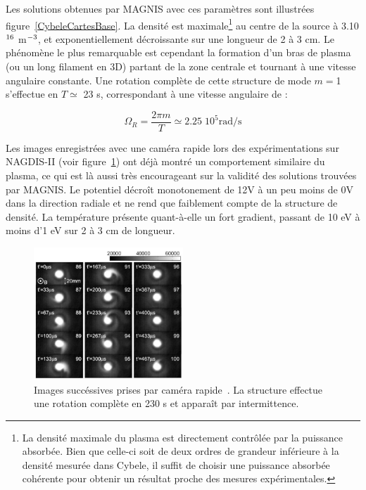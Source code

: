 \begin{refsection}
Les solutions obtenues par MAGNIS avec ces paramètres sont illustrées
figure~\ref{CybeleCartesBase}. La densité est maximale\footnote{La
densité maximale du plasma est directement contrôlée par la puissance
absorbée. Bien que celle-ci soit de deux ordres de grandeur inférieure à la
densité mesurée dans Cybele, il suffit de choisir une puissance absorbée
cohérente pour obtenir un résultat proche des mesures expérimentales.} au centre
de la source à 3.10$^{{16}}$ m$^{{-3}}$, et
exponentiellement décroissante sur une longueur de 2 à 3 cm. Le phénomène le plus
remarquable est cependant la formation d'un bras de plasma (ou un long filament
en 3D) partant de la zone centrale et tournant à une vitesse angulaire
constante.
Une rotation complète de cette structure de mode $m=$1 s'effectue en $T\simeq$
23 \micro s, correspondant à une vitesse angulaire de :

\begin{equation}
\Omega_R=\frac{2\pi m}{T}\simeq2.25\;10^5\text{rad/s}
\end{equation}

Les images enregistrées avec une caméra rapide lors des expérimentations
sur NAGDIS-II (voir figure~\ref{4-CybeleNagdis}) ont déjà montré un comportement
similaire du plasma, ce qui est là aussi très
encourageant sur la validité des solutions trouvées par MAGNIS. Le potentiel
décroît monotonement de 12V à un peu moins de 0V dans la direction radiale et
ne rend que faiblement compte de la structure de densité.
 La température présente quant-à-elle un fort gradient, passant de 10 eV à moins
 d'1 eV sur 2 à 3 cm de longueur.

\begin{figure}[!htbp]
\centering
\includegraphics[width=0.5\textwidth]{figures/4-CybeleNAGDIS.png}
\caption{Images succéssives prises par caméra rapide~\parencite{NagdisCamera}.
La structure effectue une rotation complète en 230 \micro s et apparaît par
intermittence.
\label{4-CybeleNagdis}}
\end{figure}


\end{refsection}
